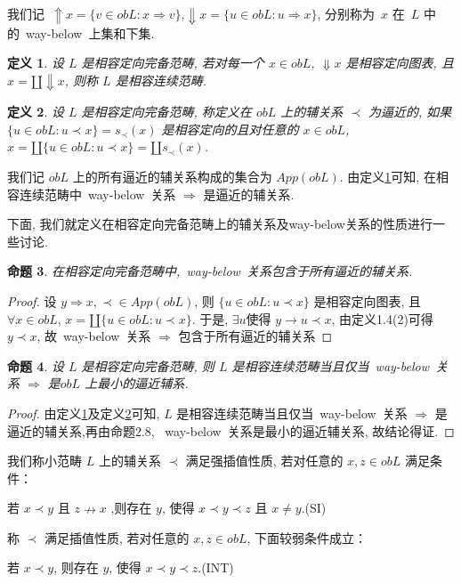 \documentclass[c5size,a4paper,hyperref,fancyhdr,UTF8,fontset=fandol]{ctexart}
\theoremstyle{nonumberplain}
\newtheorem{proof}{证明}
\newtheorem{definition}{定义}[section]
\newtheorem{proposition}[definition]{命题}
\theoremstyle{nonumberplain}
\newtheorem{proof}{证}
\begin{document}
我们记~$\Uparrow x=\{v\in obL:x\Rightarrow v\}$,$\Downarrow x=\{u\in obL:u\Rightarrow x\}$, 分别称为~$x$ 在~$L$ 中的~way-below~上集和下集.

\begin{definition}\label{def:2.6}
  设 $L$ 是相容定向完备范畴, 若对每一个 $x\in obL$, $\Downarrow x$ 是相容定向图表, 且 $x=\amalg\Downarrow x$, 则称 $L$ 是相容连续范畴.
\end{definition}

\begin{definition}\label{def:2.7}
  设 $L$ 是相容定向完备范畴, 称定义在 $obL$ 上的辅关系 $\prec$ 为逼近的, 如果 $\{u\in obL:u\prec x\}=s_{\prec}(x)$ 是相容定向的且对任意的 $x\in obL$, $x=\amalg\{u\in obL:u\prec x\}=\amalg s_{\prec}(x)$.
\end{definition}

我们记 $obL$ 上的所有逼近的辅关系构成的集合为 $App(obL)$. 由定义\ref{def:2.6}可知, 在相容连续范畴中~way-below~关系 $\Rightarrow$ 是逼近的辅关系.\vspace{0.2cm}

下面, 我们就定义在相容定向完备范畴上的辅关系及way-below关系的性质进行一些讨论.

\begin{proposition}
  在相容定向完备范畴中,~way-below~关系包含于所有逼近的辅关系.
\end{proposition}

\begin{proof}
  设 $y\Rightarrow x ,\prec\in App(obL)$, 则 $\{u\in obL:u\prec x\}$ 是相容定向图表, 且 $\forall x\in obL$, $x=\amalg\{u\in obL:u\prec x\}$. 于是, $\exists u$使得 $y\rightarrow u\prec x$, 由定义1.4(2)可得~$y\prec x$, 故~way-below~关系 $\Rightarrow$ 包含于所有逼近的辅关系
\end{proof}

\begin{proposition}\label{prop:2.9}
  设 $L$ 是相容定向完备范畴, 则 $L$ 是相容连续范畴当且仅当~way-below~关系 $\Rightarrow$ 是$obL$ 上最小的逼近辅系.
\end{proposition}

\begin{proof}
  由定义\ref{def:2.6}及定义\ref{def:2.7}可知, $L$ 是相容连续范畴当且仅当~way-below~关系 $\Rightarrow$ 是逼近的辅关系,再由命题2.8, ~way-below~关系是最小的逼近辅关系, 故结论得证.
\end{proof}

我们称小范畴 $L$ 上的辅关系 $\prec$ 满足强插值性质, 若对任意的 $x,z\in obL$ 满足条件：
\begin{center}
  若 $x\prec y$ 且 $z\nrightarrow x$ ,则存在 $y$, 使得 $x\prec y\prec z$ 且 $x\neq y$.(SI)
\end{center}
称 $\prec$ 满足插值性质, 若对任意的 $x,z\in obL$, 下面较弱条件成立：
\begin{center}
  若 $x\prec y$, 则存在 $y$, 使得 $x\prec y\prec z$.(INT)
\end{center}
\end{document}
